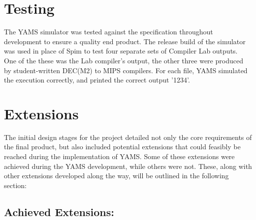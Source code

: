 \section{Testing}

The YAMS simulator was tested against the specification throughout development to ensure a quality end product. The release build of the simulator was used in place of Spim to test four separate sets of Compiler Lab outputs. One of the these was the Lab compiler's output, the other three were produced by student-written DEC(M2) to MIPS compilers. For each file, YAMS simulated the execution correctly, and printed the correct output '1234'.





\section{Extensions}

The initial design stages for the project detailed not only the core requirements of the final product, but also included potential extensions that could feasibly be reached during the implementation of YAMS. Some of these extensions were achieved during the YAMS development, while others were not. These, along with other extensions developed along the way, will be outlined in the following section:

\subsection{Achieved Extensions:}


